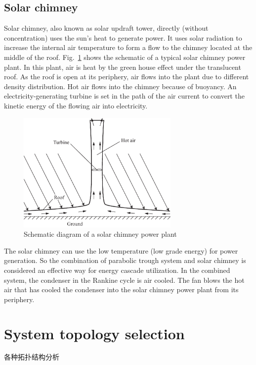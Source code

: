 \subsection{Solar chimney}
Solar chimney, also known as solar updraft tower, directly (without concentration) uses the sun's heat to generate power. It uses solar radiation to increase the internal air temperature to form a flow to the chimney located at the middle of the roof. Fig.~\ref{fig:SolarChimney} shows the schematic of a typical solar chimney power plant. In this plant, air is heat by the green house effect under the translucent roof. As the roof is open at its periphery, air flows into the plant due to different density distribution. Hot air flows into the chimney because of buoyancy. An electricity-generating turbine is set in the path of the air current to convert the kinetic energy of the flowing air into electricity.

\begin{figure}[!ht]
\centering 
\includegraphics[width=0.7\textwidth]{fig/SolarChimney}
\caption{Schematic diagram of a solar chimney power plant}\label{fig:SolarChimney}
\end{figure}

The solar chimney can use the low temperature (low grade energy) for power generation. So the combination of parabolic trough system and solar chimney is considered an effective way for energy cascade utilization. In the combined system, the condenser in the Rankine cycle is air cooled. The fan blows the hot air that has cooled the condenser into the solar chimney power plant from its periphery. 



\section{System topology selection}
各种拓扑结构分析


